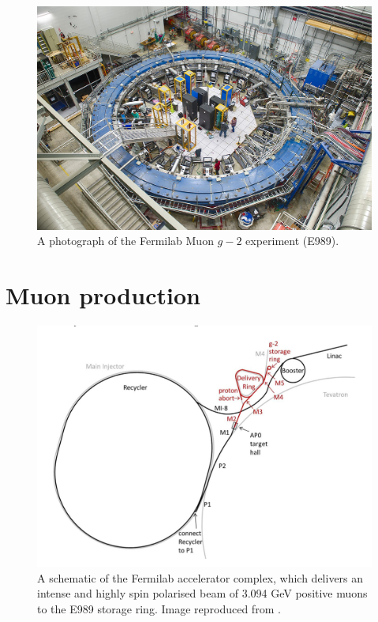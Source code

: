 \begin{figure}[t!]
\centering{}
\includegraphics[trim={0 0 0 0},clip,width=.89\textwidth]{Images/Chapter3/E989_photo.jpg}
\caption{A photograph of the Fermilab Muon $g-2$ experiment (E989).}
\label{fig:E989_photo}
\end{figure}
%
%
\section{Muon production}

\begin{figure}[t!]
\centering{}
\includegraphics[trim={0 0 0 0},clip,width=.89\textwidth]{Images/Chapter3/AcceleratorComplex.png}
\caption{A schematic of the Fermilab accelerator complex, which delivers an intense and highly spin polarised beam of 3.094 GeV positive muons to the E989 storage ring. Image reproduced from \cite{TDR}.}
\label{fig:AcceleratorComplex}
\end{figure}  

